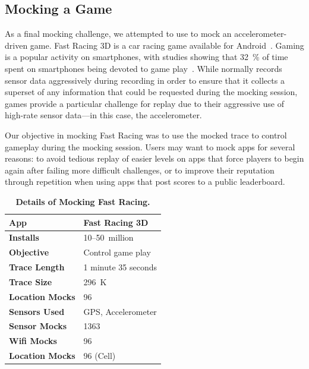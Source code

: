\subsection{Mocking a Game}

As a final mocking challenge, we attempted to use \PocketMocker{} to mock an
accelerometer-driven game. Fast Racing 3D is a car racing game available for
Android~\cite{fastracing-playstore-url}. Gaming is a popular activity on
smartphones, with studies showing that 32~\% of time spent on smartphones
being devoted to game play~\cite{flurry-smartphoneuse}. While \PocketMocker{}
normally records sensor data aggressively during recording in order to ensure
that it collects a superset of any information that could be requested during
the mocking session, games provide a particular challenge for replay due to
their aggressive use of high-rate sensor data---in this case, the
accelerometer.

Our objective in mocking Fast Racing was to use the mocked trace to control
gameplay during the mocking session. Users may want to mock apps for several
reasons: to avoid tedious replay of easier levels on apps that force players
to begin again after failing more difficult challenges, or to improve their
reputation through repetition when using apps that post scores to a public
leaderboard.

\begin{table}
\vspace*{-0.1in}
{\small
\begin{tabularx}{0.6\textwidth}{lX}
\textbf{App} & Fast Racing 3D \\ \toprule
\textbf{Installs} & 10--50~million \\
\textbf{Objective} & Control game play \\ \midrule
\textbf{Trace Length} & 1 minute 35 seconds \\
\textbf{Trace Size} & 296~K \\
\textbf{Location Mocks} & 96 \\
\textbf{Sensors Used} & {\small GPS, Accelerometer} \\
\textbf{Sensor Mocks} & 1363 \\
\textbf{Wifi Mocks} & 96 \\
\textbf{Location Mocks} & 96 (Cell) \\
\end{tabularx}

\caption{\textbf{Details of Mocking Fast Racing.}}
\vspace*{-0.1in}

\label{table-mocking-fastracing}
}
\vspace*{-0.1in}
\end{table}

